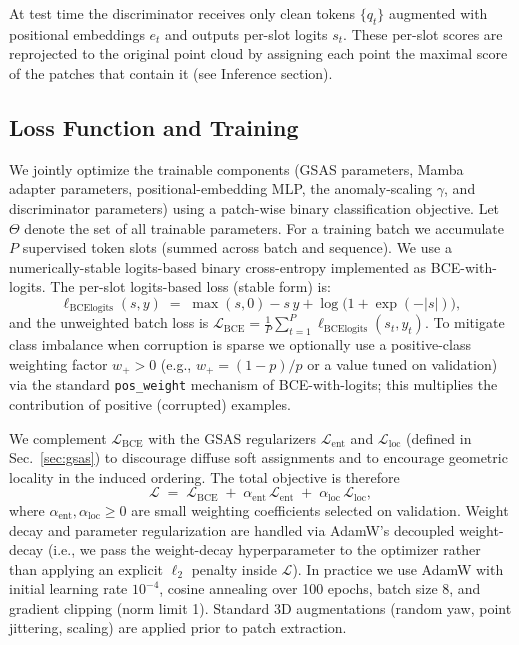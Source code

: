 At test time the discriminator receives only clean tokens \(\{q_t\}\) augmented with positional embeddings \(e_t\) and outputs per-slot logits \(s_t\). These per-slot scores are reprojected to the original point cloud by assigning each point the maximal score of the patches that contain it (see Inference section).

\subsection{Loss Function and Training}
\label{sec:loss}

We jointly optimize the trainable components (GSAS parameters, Mamba adapter parameters, positional-embedding MLP, the anomaly-scaling \(\gamma\), and discriminator parameters) using a patch-wise binary classification objective. Let \(\Theta\) denote the set of all trainable parameters. For a training batch we accumulate \(P\) supervised token slots (summed across batch and sequence). We use a numerically-stable logits-based binary cross-entropy implemented as BCE-with-logits. The per-slot logits-based loss (stable form) is:
\begin{equation}
\ell_{\mathrm{BCElogits}}(s,y) \;=\; \max(s,0) - s\,y + \log\big(1+\exp(-|s|)\big),
\end{equation}
and the unweighted batch loss is \(\mathcal{L}_{\mathrm{BCE}}=\frac{1}{P}\sum_{t=1}^P \ell_{\mathrm{BCElogits}}(s_t,y_t)\). To mitigate class imbalance when corruption is sparse we optionally use a positive-class weighting factor \(w_+>0\) (e.g., \(w_+=(1-p)/p\) or a value tuned on validation) via the standard \texttt{pos\_weight} mechanism of BCE-with-logits; this multiplies the contribution of positive (corrupted) examples.

We complement \(\mathcal{L}_{\mathrm{BCE}}\) with the GSAS regularizers \(\mathcal{L}_{\mathrm{ent}}\) and \(\mathcal{L}_{\mathrm{loc}}\) (defined in Sec.~\ref{sec:gsas}) to discourage diffuse soft assignments and to encourage geometric locality in the induced ordering. The total objective is therefore
\begin{equation}
\mathcal{L} \;=\; \mathcal{L}_{\mathrm{BCE}} \;+\; \alpha_{\mathrm{ent}}\,\mathcal{L}_{\mathrm{ent}} \;+\; \alpha_{\mathrm{loc}}\,\mathcal{L}_{\mathrm{loc}},
\end{equation}
where \(\alpha_{\mathrm{ent}},\alpha_{\mathrm{loc}}\ge 0\) are small weighting coefficients selected on validation. Weight decay and parameter regularization are handled via AdamW's decoupled weight-decay (i.e., we pass the weight-decay hyperparameter to the optimizer rather than applying an explicit \(\ell_2\) penalty inside \(\mathcal{L}\)). In practice we use AdamW with initial learning rate \(10^{-4}\), cosine annealing over 100 epochs, batch size 8, and gradient clipping (norm limit 1). Standard 3D augmentations (random yaw, point jittering, scaling) are applied prior to patch extraction.

